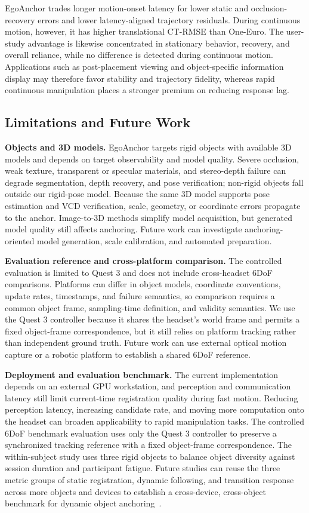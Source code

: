 \documentclass[review]{vgtc}
\begin{document}
EgoAnchor trades longer motion-onset latency for lower static and occlusion-recovery errors and lower latency-aligned trajectory residuals. During continuous motion, however, it has higher translational CT-RMSE than One-Euro. The user-study advantage is likewise concentrated in stationary behavior, recovery, and overall reliance, while no difference is detected during continuous motion. Applications such as post-placement viewing and object-specific information display may therefore favor stability and trajectory fidelity, whereas rapid continuous manipulation places a stronger premium on reducing response lag.

\subsection{Limitations and Future Work}

\textbf{Objects and 3D models.}
EgoAnchor targets rigid objects with available 3D models and depends on target observability and model quality. Severe occlusion, weak texture, transparent or specular materials, and stereo-depth failure can degrade segmentation, depth recovery, and pose verification; non-rigid objects fall outside our rigid-pose model. Because the same 3D model supports pose estimation and VCD verification, scale, geometry, or coordinate errors propagate to the anchor. Image-to-3D methods simplify model acquisition, but generated model quality still affects anchoring. Future work can investigate anchoring-oriented model generation, scale calibration, and automated preparation.

\textbf{Evaluation reference and cross-platform comparison.}
The controlled evaluation is limited to Quest 3 and does not include cross-headset 6DoF comparisons. Platforms can differ in object models, coordinate conventions, update rates, timestamps, and failure semantics, so comparison requires a common object frame, sampling-time definition, and validity semantics. We use the Quest 3 controller because it shares the headset's world frame and permits a fixed object-frame correspondence, but it still relies on platform tracking rather than independent ground truth. Future work can use external optical motion capture or a robotic platform to establish a shared 6DoF reference.

\textbf{Deployment and evaluation benchmark.}
The current implementation depends on an external GPU workstation, and perception and communication latency still limit current-time registration quality during fast motion. Reducing perception latency, increasing candidate rate, and moving more computation onto the headset can broaden applicability to rapid manipulation tasks. The controlled 6DoF benchmark evaluation uses only the Quest 3 controller to preserve a synchronized tracking reference with a fixed object-frame correspondence. The within-subject study uses three rigid objects to balance object diversity against session duration and participant fatigue. Future studies can reuse the three metric groups of static registration, dynamic following, and transition response across more objects and devices to establish a cross-device, cross-object benchmark for dynamic object anchoring~\cite{cheng2024tracking,hu2024applemeta,hu2025xrrealitycheck}.
\end{document}
